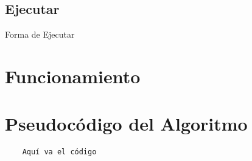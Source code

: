 \documentclass[a4paper,12pt]{article}
\begin{document}
\subsection*{Ejecutar}
\begin{center}
    Forma de Ejecutar
\end{center}

\section*{Funcionamiento}



\section*{Pseudocódigo del Algoritmo}


\begin{verbatim}
    Aquí va el código 
\end{verbatim}

\end{document}
